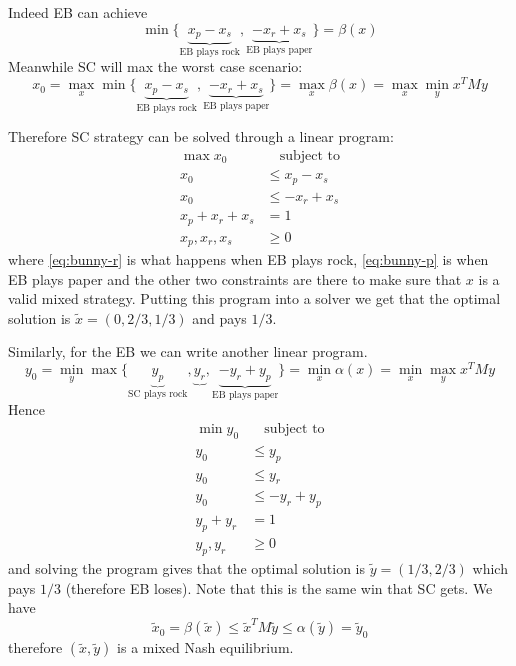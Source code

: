 \documentclass[12pt]{extarticle}
\begin{document}
Indeed EB can achieve
\begin{equation}
	\min \{ \underbrace{x_p - x_s}_{\text{EB plays rock}},
	\underbrace{ -x_r + x_s}_{\text{EB plays paper}}\} = \beta(x)
\end{equation}
Meanwhile SC will max the worst case scenario:
\begin{equation}
	x_0 = \max_{x} \min \{ \underbrace{x_p - x_s}_{\text{EB plays rock}} ,
	\underbrace{ -x_r + x_s}_{\text{EB plays paper}}\}
	= \max_x \beta(x)
	= \max_x \min_y x^T M y
\end{equation}

Therefore SC strategy can be solved through a linear program:
\begin{align}
	\max             x_0 & \quad \text{subject to}                    \\
	x_0                  & \leq x_p - x_s          \label{eq:bunny-r} \\
	x_0                  & \leq -x_r + x_s         \label{eq:bunny-p} \\
	x_p + x_r + x_s      & = 1                                        \\
	x_p, x_r, x_s        & \geq 0
\end{align}
where \cref{eq:bunny-r} is what happens when EB plays rock, \cref{eq:bunny-p} is when EB plays paper
and the other two constraints are there to make sure that $x$ is a valid mixed strategy.
Putting this program into a solver we get that the optimal solution is $\tilde x = (0, 2/3, 1/3)$
and pays $1/3$.

Similarly, for the EB we can write another linear program.
\begin{equation}
	y_0 = \min_{y} \max \{ \underbrace{y_p}_{\text{SC plays rock}} ,
	\underbrace{y_r},
	\underbrace{ -y_r + y_p}_{\text{EB plays paper}}\}
	= \min_x \alpha(x)
	= \min_x \max_y x^T M y
\end{equation}
Hence
\begin{align}
	\min y_0  & \quad \text{subject to} \\
	y_0       & \leq y_p                \\
	y_0       & \leq y_r                \\
	y_0       & \leq -y_r + y_p         \\
	y_p + y_r & = 1                     \\
	y_p, y_r  & \geq 0
\end{align}
and solving the program gives that the optimal solution is $\tilde y = (1/3, 2/3)$ which pays $1/3$
(therefore EB loses).
Note that this is the same win that SC gets.
We have
\begin{equation}
	\tilde x_0 = \beta(\tilde x) \leq \tilde x^T M \tilde y \leq \alpha(\tilde y) = \tilde y_0
\end{equation}
therefore $(\tilde x, \tilde y)$ is a mixed Nash equilibrium.
\end{document}

